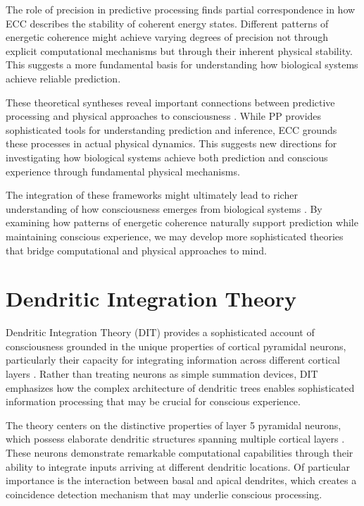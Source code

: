 \begin{refsection}
The role of precision in predictive processing \cite{Hohwy2008} finds partial correspondence in how ECC describes the stability of coherent energy states. Different patterns of energetic coherence might achieve varying degrees of precision not through explicit computational mechanisms but through their inherent physical stability. This suggests a more fundamental basis for understanding how biological systems achieve reliable prediction.

These theoretical syntheses reveal important connections between predictive processing and physical approaches to consciousness \cite{Seth2014}. While PP provides sophisticated tools for understanding prediction and inference, ECC grounds these processes in actual physical dynamics. This suggests new directions for investigating how biological systems achieve both prediction and conscious experience through fundamental physical mechanisms.

The integration of these frameworks might ultimately lead to richer understanding of how consciousness emerges from biological systems \cite{Clark2013}. By examining how patterns of energetic coherence naturally support prediction while maintaining conscious experience, we may develop more sophisticated theories that bridge computational and physical approaches to mind.

\section{Dendritic Integration Theory}

Dendritic Integration Theory (DIT) provides a sophisticated account of consciousness grounded in the unique properties of cortical pyramidal neurons, particularly their capacity for integrating information across different cortical layers \cite{Larkum2009}. Rather than treating neurons as simple summation devices, DIT emphasizes how the complex architecture of dendritic trees enables sophisticated information processing that may be crucial for conscious experience.

The theory centers on the distinctive properties of layer 5 pyramidal neurons, which possess elaborate dendritic structures spanning multiple cortical layers \cite{Major2013}. These neurons demonstrate remarkable computational capabilities through their ability to integrate inputs arriving at different dendritic locations. Of particular importance is the interaction between basal and apical dendrites, which creates a coincidence detection mechanism that may underlie conscious processing.


\end{refsection}
